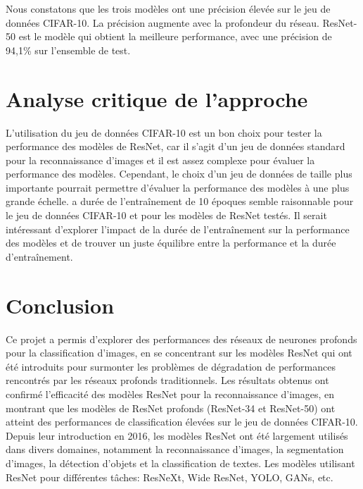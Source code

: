 \documentclass{article}
\begin{document}
Nous constatons que les trois modèles ont une précision élevée sur le jeu de données CIFAR-10.
La précision augmente avec la profondeur du réseau. ResNet-50 est le modèle qui obtient la meilleure performance,
avec une précision de 94,1\% sur l'ensemble de test.

\section{Analyse critique de l'approche}

L'utilisation du jeu de données CIFAR-10 est un bon choix pour tester la performance des modèles de ResNet,
car il s'agit d'un jeu de données standard pour la reconnaissance d'images et il est assez complexe pour évaluer
la performance des modèles.
Cependant, le choix d'un jeu de données de taille plus importante pourrait permettre d'évaluer la performance
des modèles à une plus grande échelle.
a durée de l'entraînement de 10 époques semble raisonnable pour le jeu de données CIFAR-10 et pour les
modèles de ResNet testés. Il serait intéressant d'explorer l'impact de la durée de l'entraînement sur la
performance des modèles et de trouver un juste équilibre entre la performance et la durée d'entraînement.

\section{Conclusion}

Ce projet a permis d'explorer des performances des réseaux de neurones profonds pour la classification d'images,
en se concentrant sur les modèles ResNet qui ont été introduits pour surmonter les problèmes de dégradation de
performances rencontrés par les réseaux profonds traditionnels.
Les résultats obtenus ont confirmé l'efficacité des modèles ResNet pour la reconnaissance d'images, en montrant
que les modèles de ResNet profonds (ResNet-34 et ResNet-50) ont atteint des performances de classification élevées
sur le jeu de données CIFAR-10.
Depuis leur introduction en 2016, les modèles ResNet ont été largement utilisés dans divers domaines, notamment
la reconnaissance d'images, la segmentation d'images, la détection d'objets et la classification de textes.
Les modèles utilisant ResNet pour différentes tâches: ResNeXt, Wide ResNet, YOLO, GANs, etc.



\end{document}
